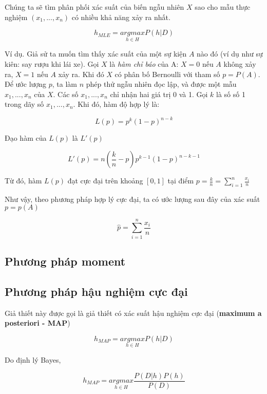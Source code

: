 Chúng ta sẽ tìm phân phối xác suất của biến ngẫu nhiên $X$ sao cho mẫu thực nghiệm $(x_1, ..., x_n)$ có nhiều khả năng xảy ra nhất.

$$h_{MLE} = \underset{h \in H}{argmax} P(h|D)$$


Ví dụ. Giả sử ta muốn tìm thấy xác suất của một sự kiện $A$ nào đó (ví dụ như sự kiên: say rượu khi lái xe). Gọi $X$ là \textit{hàm chỉ báo} của A: $X = 0$ nếu $A$ không xảy ra, $X = 1$ nếu $A$ xảy ra. Khi đó $X$ có phân bố Bernoulli với tham số $p = P(A)$. Để ước lượng $p$, ta làm $n$ phép thử ngẫu nhiên đọc lập, và được một mẫu $x_1, ..., x_n$ của $X$. Các số $x_1, ..., x_n$ chỉ nhận hai giá trị 0 và 1. Gọi $k$ là số số 1 trong dãy số $x_1, ..., x_n$. Khi đó, hàm độ hợp lý là:

$$L(p) = p^k (1-p)^{n-k}$$

Đạo hàm của $L(p)$ là $L'(p)$

$$L'(p) = n\left(\frac{k}{n} - p\right) p^{k-1} (1-p)^{n-k-1}$$

Từ đó, hàm $L(p)$ đạt cực đại trên khoảng $[0, 1]$ tại điểm $p = \frac{k}{n}=\sum_{i=1}^n \frac{x_i}{n}$

Như vậy, theo phương pháp hợp lý cực đại, ta có ước lượng sau đây của xác suất $p=p(A)$

$$\hat{p} = \sum_{i=1}^{n} \frac{x_i}{n}$$

\subsection{Phương pháp moment}

\subsection{Phương pháp hậu nghiệm cực đại}



Giả thiết này được gọi là giả thiết có xác suất hậu nghiệm cực đại (\textbf{maximum a posteriori - MAP})

$$h_{MAP} = \underset{h \in H}{argmax} P(h|D)$$

Do định lý Bayes,

$$h_{MAP} = \underset{h \in H}{argmax} \frac{P(D|h)P(h)}{P(D)}$$

